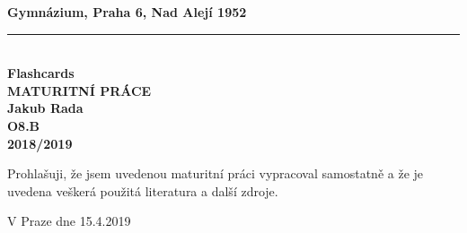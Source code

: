\begin{titlepage}
    \begin{center}
        \vspace*{1cm}
        \textbf{\large Gymnázium, Praha 6, Nad Alejí 1952}\\
        \vspace{0.2cm}
        \rule{\textwidth}{0.5pt}\\
        \vspace{5cm}
        \textbf{\Huge Flashcards}\\
        \vspace{5cm}
        \textbf{\large MATURITNÍ PRÁCE}\\
        \vspace{2cm}
        \textbf{\large Jakub Rada}\\
        \textbf{O8.B}\\
        \vspace*{\fill}
        \textbf{\large 2018/2019}\\
    \end{center}
\end{titlepage}
\newpage
\vspace*{5cm}
Prohlašuji, že jsem uvedenou maturitní práci vypracoval samostatně a že je uvedena veškerá použitá literatura a další zdroje.\newline
\begin{minipage}{0.7\textwidth}
    \vspace{1cm}
    V Praze dne 15.4.2019
\end{minipage}
\begin{minipage}{0.3\textwidth}
    \vspace{1cm}
    \begin{flushright}
        \vspace{11pt}
        \hrulefill
    \end{flushright}
\end{minipage}

